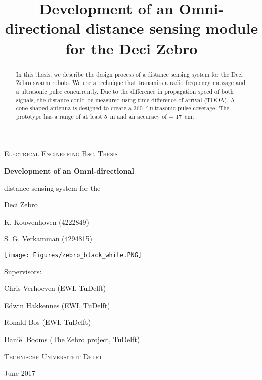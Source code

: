 \documentclass[
11pt, %
english, %
singlespacing, %
headsepline, %
]{MastersDoctoralThesis} %
\title{Development of an Omni-directional distance sensing module for the Deci Zebro}
\begin{document}
\frontmatter %

\pagestyle{plain} %



 \begin{titlepage}

	\vspace{1cm}
	{\scshape\Large Electrical Engineering Bsc. Thesis\par}
	\vspace{1cm}
	{\huge\bfseries Development of an Omni-directional\par distance sensing system for the\par Deci Zebro\par}
	\vspace{1.5cm}
	K. Kouwenhoven (4222849) \par S. G. Verkamman (4294815)\par
	\vspace{1.5cm}
  \texttt{[image: Figures/zebro\_black\_white.PNG]}\par
	\vfill
	{\Large Supervisors:\par}
	Chris Verhoeven (EWI, TuDelft)\par
	Edwin Hakkennes (EWI, TuDelft)\par
	Ronald Bos (EWI, TuDelft)\par
	Daniël Booms (The Zebro project, TuDelft)\par
	\vspace{1cm}
	{\scshape\large Technische Universiteit Delft\par}
	{\large June 2017}
 \end{titlepage}


\begin{abstract}
\addchaptertocentry{\abstractname} %
In this thesis, we describe the design process of a distance sensing system for the Deci Zebro swarm robots.
We use a technique that transmits a radio frequency message and a ultrasonic pulse concurrently.
Due to the difference in propagation speed of both signals, the distance could be measured using time difference of arrival (TDOA).
A cone shaped antenna is designed to create a \SI{360}{\degree} ultrasonic pulse coverage.
The prototype has a range of at least \SI{5}{\meter} and an accuracy of $\pm$ \SI{17}{\centi\meter}.
\end{abstract}
\end{document}
